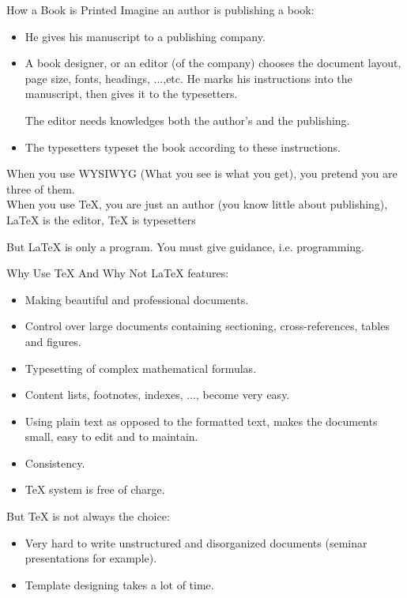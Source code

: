 \documentclass[10pt,t]{beamer}
\begin{document}
\begin{frame}{How a Book is Printed}
Imagine an author is publishing a book:
\begin{itemize}
    \item He gives his manuscript to a publishing company.
    \item A book designer, or an editor (of the company) chooses
        the document layout, page size, fonts, headings, ...,etc.
        He marks his instructions into the manuscript, then gives
        it to the typesetters.

        The editor needs knowledges both the author's and the publishing.
    \item The typesetters typeset the book according to these instructions.
\end{itemize}

    When you use WYSIWYG (\alert{What you see is what you get}),
    you pretend you are three of them.\\[10pt]

    When you use \TeX{}, you are just an author (you know little
    about publishing), \LaTeX{} is the editor, \TeX{} is typesetters

    But \LaTeX{} is only a program. You must give guidance, i.e.
    programming.
\end{frame}

\begin{frame}{Why Use \TeX{} And Why Not}
\LaTeX{} features:
\begin{itemize}
    \item Making beautiful and professional documents.
    \item Control over large documents containing sectioning,
        cross-references, tables and figures.
    \item Typesetting of complex mathematical formulas.
    \item Content lists, footnotes, indexes, ..., become very easy.
    \item Using plain text as opposed to the formatted text,
        makes the documents small, easy to edit and to maintain.
    \item Consistency.
    \item \TeX{} system is free of charge.
\end{itemize}

    But \TeX{} is not always the choice:
\begin{itemize}
    \item Very hard to write unstructured and disorganized documents
        (seminar presentations for example).
    \item Template designing takes a lot of time.
\end{itemize}
\end{frame}
\end{document}
